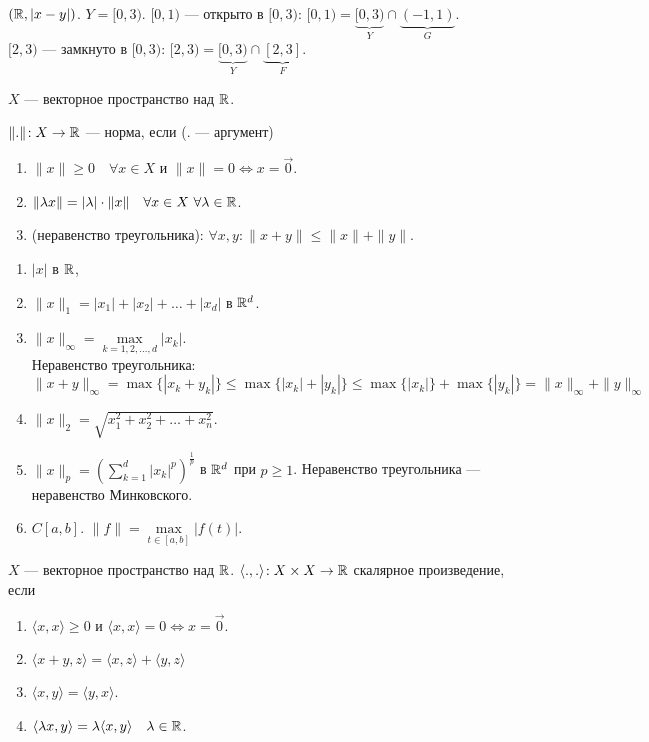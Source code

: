 \begin{example}
     $(\mathbb{R}, |x-y|)$.  $Y = [0, 3)$.  $[0, 1)$ --- открыто в  $[0, 3)$:  $[0, 1) = \underbrace{[0, 3)}_{Y} \cap \underbrace{(-1, 1)}_{G}$.\\
     $[2, 3)$ --- замкнуто в  $[0, 3)$:  $[2, 3) = \underbrace{[0, 3)}_{Y} \cap \underbrace{[2, 3]}_{F}$.
\end{example}
 
\begin{definition}
     $X$ --- векторное пространство над  $\mathbb{R}$.

      $\|.\|\!: X \to \mathbb{R}$ --- норма, если (. --- аргумент)
       \begin{enumerate}
           \item $\|x\| \ge 0\quad \forall x \in X$ и $\|x\| = 0 \iff x = \overrightarrow{0}$.
           \item  $\|\lambda x\| = |\lambda| \cdot \|x\|\quad \forall x \in X\ \forall \lambda \in \mathbb{R}$. 
           \item (неравенство треугольника): $\forall x, y\!: \|x + y\| \le \|x\| + \|y\|$.
      \end{enumerate}
\end{definition}
\begin{example}
     \begin{enumerate}
         \item $|x|$ в $\mathbb{R}$,
         \item  $\|x\|_1 = |x_1| + |x_2| + \ldots + |x_d|$ в $\mathbb{R}^d$.
         \item  $\|x\|_{\infty} = \max\limits_{k=1,2,\ldots, d} |x_k|$. \\ Неравенство треугольника: $\|x+y\|_{\infty} = \max\{|x_k+y_k|\} \le \max\{|x_k|+|y_k|\} \le \max\{|x_k|\} + \max\{|y_k|\} = \|x\|_{\infty} + \|y\|_{\infty}$
         \item $\|x\|_2 = \sqrt{x_1^2 + x_2^2 + \ldots + x_n^2}$.
         \item $\|x\|_p = \left(\sum\limits_{k=1}^d |x_k|^p\right)^{\frac{1}{p}}$ в $\mathbb{R}^d$ при  $p \ge 1$. Неравенство треугольника --- неравенство Минковского.
         \item $C[a, b]$.  $\|f\| = \max\limits_{t \in [a, b]} |f(t)|$. 
     \end{enumerate}
\end{example}
\begin{definition}
    $X$ --- векторное пространство над  $\mathbb{R}$.  $\langle .,.\rangle\!: X \times X \to \mathbb{R}$ скалярное произведение, если
     \begin{enumerate}
         \item $\langle x, x \rangle \ge 0$ и $\langle x, x \rangle = 0 \iff x = \overrightarrow{0}$.
         \item  $\langle x+y, z\rangle = \langle x, z \rangle + \langle y, z \rangle$
         \item  $\langle x, y \rangle = \langle y, x \rangle$.
         \item  $\langle \lambda x, y \rangle = \lambda \langle x, y \rangle \quad \lambda \in \mathbb{R}$.
    \end{enumerate}
\end{definition}
